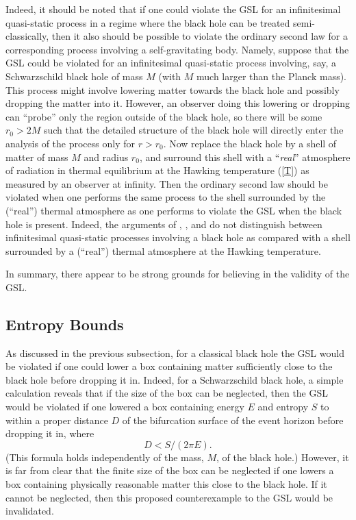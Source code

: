 \documentclass[12pt]{article}
\begin{document}
Indeed, it should be noted that if one could violate the GSL for an
infinitesimal quasi-static process in a regime where the black hole
can be treated semi-classically, then it also should be possible to
violate the ordinary second law for a corresponding process involving
a self-gravitating body. Namely, suppose that the GSL could be
violated for an infinitesimal quasi-static process involving, say, a
Schwarzschild black hole of mass $M$ (with $M$ much larger than the
Planck mass). This process might involve lowering matter towards the
black hole and possibly dropping the matter into it. However, an
observer doing this lowering or dropping can ``probe'' only the region
outside of the black hole, so there will be some $r_0 > 2M$ such that
the detailed structure of the black hole will directly enter the
analysis of the process only for $r > r_0$. Now replace the black hole
by a shell of matter of mass $M$ and radius $r_0$, and surround this
shell with a ``{\em real}'' atmosphere of radiation in thermal
equilibrium at the Hawking temperature (\ref{T}) as measured by an
observer at infinity. Then the ordinary second law should be violated
when one performs the same process to the shell surrounded by the
(``real'') thermal atmosphere as one performs to violate the GSL when
the black hole is present. Indeed, the arguments of \cite{tz},
\cite{tzp}, and \cite{w4} do not distinguish between infinitesimal
quasi-static processes involving a black hole as compared with a shell
surrounded by a (``real'') thermal atmosphere at the Hawking
temperature.

In summary, there appear to be strong grounds for believing in the
validity of the GSL.


\subsection{Entropy Bounds}
\label{eb}

As discussed in the previous subsection, for a classical black hole
the GSL would be violated if one could lower a box containing matter
sufficiently close to the black hole before dropping it in. Indeed,
for a Schwarzschild black hole, a simple calculation reveals that if
the size of the box can be neglected, then the GSL would be violated
if one lowered a box containing energy $E$ and entropy $S$ to within a
proper distance $D$ of the bifurcation surface of the event horizon
before dropping it in, where
\begin{equation}
D < S/(2\pi E) .
\label{D}
\end{equation}
(This formula holds independently of the mass, $M$, of the black
hole.)  However, it is far from clear that the finite size of the box
can be neglected if one lowers a box containing physically reasonable
matter this close to the black hole. If it cannot be neglected, then
this proposed counterexample to the GSL would be invalidated.
\end{document}
